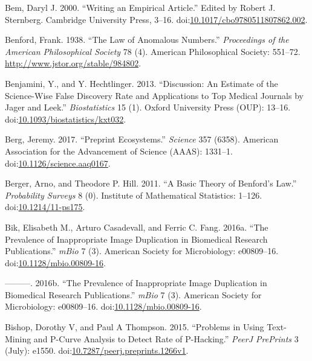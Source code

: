 \documentclass[a5paper]{book}
\begin{document}
\hypertarget{ref-doi:10.1017ux2fcbo9780511807862.002}{}
Bem, Daryl J. 2000. ``Writing an Empirical Article.'' Edited by Robert
J. Sternberg. Cambridge University Press, 3--16.
doi:\href{https://doi.org/10.1017/cbo9780511807862.002}{10.1017/cbo9780511807862.002}.

\hypertarget{ref-doi:10.2307ux2f984802}{}
Benford, Frank. 1938. ``The Law of Anomalous Numbers.''
\emph{Proceedings of the American Philosophical Society} 78 (4).
American Philosophical Society: 551--72.
\url{http://www.jstor.org/stable/984802}.

\hypertarget{ref-doi:10.1093ux2fbiostatisticsux2fkxt032}{}
Benjamini, Y., and Y. Hechtlinger. 2013. ``Discussion: An Estimate of
the Science-Wise False Discovery Rate and Applications to Top Medical
Journals by Jager and Leek.'' \emph{Biostatistics} 15 (1). Oxford
University Press (OUP): 13--16.
doi:\href{https://doi.org/10.1093/biostatistics/kxt032}{10.1093/biostatistics/kxt032}.

\hypertarget{ref-doi:10.1126ux2fscience.aaq0167}{}
Berg, Jeremy. 2017. ``Preprint Ecosystems.'' \emph{Science} 357 (6358).
American Association for the Advancement of Science (AAAS): 1331--1.
doi:\href{https://doi.org/10.1126/science.aaq0167}{10.1126/science.aaq0167}.

\hypertarget{ref-doi:10.1214ux2f11-ps175}{}
Berger, Arno, and Theodore P. Hill. 2011. ``A Basic Theory of Benford's
Law.'' \emph{Probability Surveys} 8 (0). Institute of Mathematical
Statistics: 1--126.
doi:\href{https://doi.org/10.1214/11-ps175}{10.1214/11-ps175}.

\hypertarget{ref-doi:10.1128ux2fmbio.00809-16}{}
Bik, Elisabeth M., Arturo Casadevall, and Ferric C. Fang. 2016a. ``The
Prevalence of Inappropriate Image Duplication in Biomedical Research
Publications.'' \emph{mBio} 7 (3). American Society for Microbiology:
e00809--16.
doi:\href{https://doi.org/10.1128/mbio.00809-16}{10.1128/mbio.00809-16}.

\hypertarget{ref-doi:10.1128ux2fmBio.00809-16}{}
---------. 2016b. ``The Prevalence of Inappropriate Image Duplication in
Biomedical Research Publications.'' \emph{mBio} 7 (3). American Society
for Microbiology: e00809--16.
doi:\href{https://doi.org/10.1128/mbio.00809-16}{10.1128/mbio.00809-16}.

\hypertarget{ref-doi:10.7287ux2fpeerj.preprints.1266v1}{}
Bishop, Dorothy V, and Paul A Thompson. 2015. ``Problems in Using
Text-Mining and P-Curve Analysis to Detect Rate of P-Hacking.''
\emph{PeerJ PrePrints} 3 (July): e1550.
doi:\href{https://doi.org/10.7287/peerj.preprints.1266v1}{10.7287/peerj.preprints.1266v1}.
\end{document}
